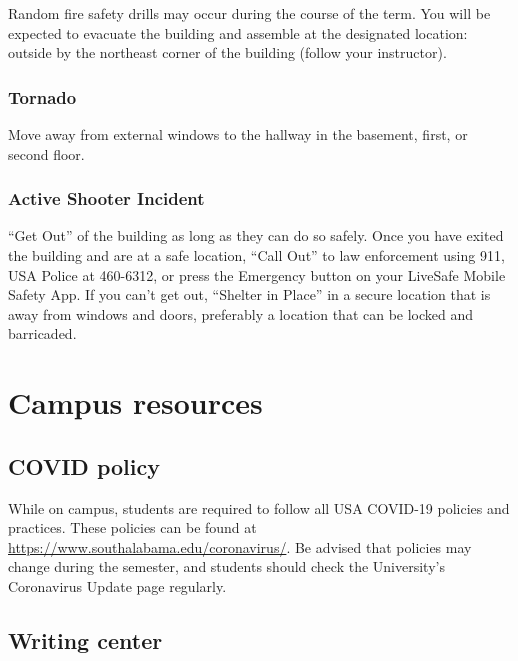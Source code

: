 \documentclass[11pt,]{article}
\begin{document}
Random fire safety drills may occur during the course of the term. You
will be expected to evacuate the building and assemble at the designated
location: outside by the northeast corner of the building (follow your
instructor).

\hypertarget{tornado}{%
\subsubsection{Tornado}\label{tornado}}

Move away from external windows to the hallway in the basement, first,
or second floor.

\hypertarget{active-shooter-incident}{%
\subsubsection{Active Shooter Incident}\label{active-shooter-incident}}

``Get Out'' of the building as long as they can do so safely. Once you
have exited the building and are at a safe location, ``Call Out'' to law
enforcement using 911, USA Police at 460-6312, or press the Emergency
button on your LiveSafe Mobile Safety App. If you can't get out,
``Shelter in Place'' in a secure location that is away from windows and
doors, preferably a location that can be locked and barricaded.

\hypertarget{campus-resources}{%
\section{Campus resources}\label{campus-resources}}

\hypertarget{covid-policy}{%
\subsection{COVID policy}\label{covid-policy}}

While on campus, students are required to follow all USA COVID-19
policies and practices. These policies can be found at
\url{https://www.southalabama.edu/coronavirus/}. Be advised that
policies may change during the semester, and students should check the
University's Coronavirus Update page regularly.

\hypertarget{writing-center}{%
\subsection{Writing center}\label{writing-center}}
\end{document}
